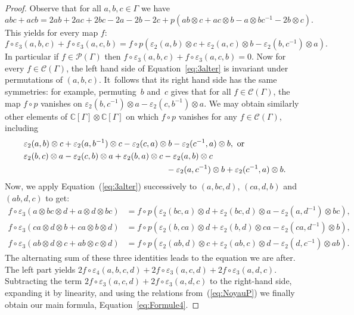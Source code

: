\documentclass[JEP,XML,SOM,Unicode,NoEqCountersInSection]{cedram}
\let\mathcal\mathscr
\theoremstyle{definition}
\newcommand{\CC}{\mathbb{C}}
\begin{document}
\begin{proof}
Observe that for all $a,b,c\in\Gamma$ we have
\[ abc+acb=2ab+2ac+2bc-2a-2b-2c+
p(ab\otimes c+ac\otimes b-a\otimes bc^{-1}-2b\otimes c). \]
This yields for every map $f$:
\begin{equation}\label{eq:3alter}
f\circ \varepsilon_3(a,b,c)+f\circ \varepsilon_3(a,c,b)
=f\circ p(\varepsilon_2(a,b)\otimes c+\varepsilon_2(a,c)\otimes b
-\varepsilon_2(b,c^{-1})\otimes a).
\end{equation}
In particular if $f\in \mathcal{P}(\Gamma)$ then
$f\circ\varepsilon_3(a,b,c)+f\circ \varepsilon_3(a,c,b)=0$.
Now for every $f\in\mathcal{C}(\Gamma)$, the left hand side of
Equation~\eqref{eq:3alter} is invariant under permutations of $(a,b,c)$.
It~follows that its right hand side has the same symmetries: for example,
permuting~$b$ and~$c$ gives that for all
$f\in\mathcal{C}(\Gamma)$, the map $f\circ p$ vanishes on
$\varepsilon_2(b,c^{-1})\otimes a - \varepsilon_2(c,b^{-1})\otimes a$.
We may obtain similarly other
elements of $\CC[\Gamma]\otimes\CC[\Gamma]$ on which $f\circ p$ vanishes
for any $f\in\mathcal{C}(\Gamma)$, including
\begin{equation}\label{eq:NoyauP}
\begin{split}
&\varepsilon_2(a,b)\otimes c + \varepsilon_2(a, b^{-1})\otimes c
- \varepsilon_2(c, a)\otimes b - \varepsilon_2(c^{-1}, a)\otimes b,
\text{ or}\\
&\varepsilon_2(b, c)\otimes a-\varepsilon_2(c, b)\otimes a
+\varepsilon_2(b, a)\otimes c -\varepsilon_2(a, b)\otimes c\\
&\hspace*{6cm}-\varepsilon_2(a, c^{-1})\otimes b + \varepsilon_2(c^{-1}, a)\otimes b.
\end{split}
\end{equation}
Now, we apply Equation~(\ref{eq:3alter}) successively to $(a,bc,d)$,
$(ca,d,b)$ and $(ab,d,c)$ to get:
\begin{align*}
f\circ \varepsilon_3(a\otimes bc\otimes d+a\otimes d\otimes bc) & =
f\circ p(\varepsilon_2(bc,a)\otimes d+\varepsilon_2(bc,d)\otimes a
-\varepsilon_2(a,d^{-1})\otimes bc), \\
f\circ\varepsilon_3(ca\otimes d\otimes b+ca\otimes b\otimes d) & =
f\circ p(\varepsilon_2(b,ca)\otimes d+\varepsilon_2(b,d)\otimes ca
-\varepsilon_2(ca,d^{-1})\otimes b), \\
f\circ\varepsilon_3(ab\otimes d\otimes c+ab\otimes c\otimes d) & =
f\circ p(\varepsilon_2(ab, d)\otimes c+\varepsilon_2(ab,c)\otimes d
-\varepsilon_2(d,c^{-1})\otimes ab).
\end{align*}
The alternating sum of these three identities leads to the equation we
are after. The left part yields
$2f\circ\varepsilon_4(a,b,c,d)
+2f\circ\varepsilon_3(a,c,d)+2f\circ\varepsilon_3(a,d,c)$.
Subtracting the term
$2f\circ\varepsilon_3(a,c,d)+2f\circ\varepsilon_3(a,d,c)$
to the right-hand side, expanding it by linearity, and using the
relations from~(\ref{eq:NoyauP}) we finally obtain our main formula,
Equation~\eqref{eq:Formule4}.


\end{proof}
\end{document}
